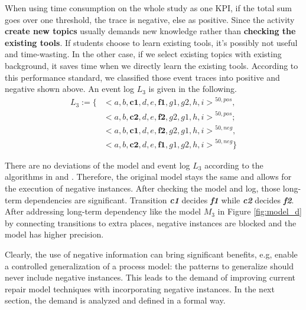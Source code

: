 When using time consumption on the whole study as one KPI, if the total sum goes over one threshold, the trace is negative, else as positive. Since the activity \textbf{create new topics} usually demands new knowledge rather than \textbf{checking the existing tools}. If students choose to learn existing tools, it's possibly not useful and time-wasting. In the other case, if we select existing topics with existing background, it saves time when we directly learn the existing tools. According to this performance standard, we classified those event traces into positive and negative shown above.
An event log $L_3$ is given in the following. 
\begin{align*}
L_3:= \{ & { <a,b,\textbf{c1},d,e,\textbf{f1},g1,g2, h,i>}^{50, pos}, \\   &{<a,b,\textbf{c2},d,e,\textbf{f2},g2,g1, h,i>}^{50, pos} ; \\
& {<a,b,\textbf{c1},d,e,\textbf{f2},g2,g1,h,i>}^{50, neg}, \\
& {<a,b,\textbf{c2},d,e,\textbf{f1},g1,g2,h,i>}^{50, neg}  \}
\end{align*}


There are no deviations of the model and event log $L_3$ according to the  algorithms in  \cite{fahland2015model} and  \cite{dees2017enhancing}. Therefore, the original model stays the same and allows for the execution of negative instances. After checking the model and log, those long-term dependencies are significant. Transition \textbf{\emph{c1}} decides \textbf{\emph{f1}} while \textbf{\emph{c2}} decides \textbf{\emph{f2}}.  After addressing long-term dependency like the model $M_3$ in Figure \ref{fig:model_d} by connecting transitions to extra places, 
negative instances are blocked and the model has higher precision.

Clearly, the use of negative information can bring significant benefits, e.g, enable a controlled generalization of a process model: the patterns to generalize should never include negative instances. This leads to the demand of improving current repair model techniques with incorporating negative instances. In the next section, the demand is analyzed and defined in a formal way.

